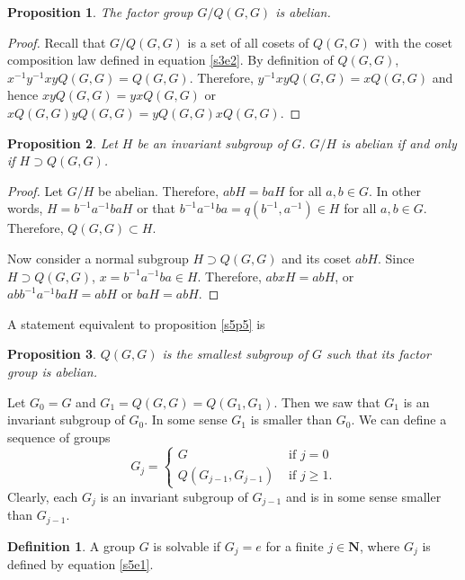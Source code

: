\documentclass{article}
\theoremstyle{plain}
\numberwithin{thm}{section}
\theoremstyle{plain}
\newtheorem{prop}{Proposition}
\numberwithin{prop}{section}
\theoremstyle{definition}
\newtheorem{defn}{Definition}
\numberwithin{defn}{section}
\theoremstyle{remark}
\numberwithin{equation}{section}
\begin{document}
\begin{prop}\label{s5p4}
The factor group $G/Q(G, G)$ is abelian.
\end{prop}
\begin{proof}
Recall that $G/Q(G, G)$ is a set of all cosets of $Q(G, G)$ with the coset
composition law defined in equation \eqref{s3e2}. By definition of $Q(G, G)$,
$x^{-1}y^{-1}xyQ(G, G) = Q(G, G)$. Therefore, $y^{-1}xyQ(G, G) = xQ(G, G)$ and
hence $xyQ(G, G) = yxQ(G, G)$ or $xQ(G, G) yQ(G, G) = yQ(G, G) xQ(G, G)$.
\end{proof}

\begin{prop}\label{s5p5}
Let $H$ be an invariant subgroup of $G$. $G/H$ is abelian if and only if $H
\supset Q(G, G)$.
\end{prop}
\begin{proof}
Let $G/H$ be abelian. Therefore, $abH = baH$ for all $a, b \in G$. In other
words, $H = b^{-1}a^{-1}baH$ or that $b^{-1}a^{-1}ba = q(b^{-1}, a^{-1}) \in
H$ for all $a, b \in G$. Therefore, $Q(G, G) \subset H$.

Now consider a normal subgroup $H \supset Q(G, G)$ and its coset $abH$.
Since $H \supset Q(G, G)$, $x = b^{-1}a^{-1}ba \in H$. Therefore, $abxH = abH$,
or $abb^{-1}a^{-1}ba H = abH$ or $baH = abH$.
\end{proof}

A statement equivalent to proposition \eqref{s5p5} is
\begin{prop}\label{s5p6}
$Q(G, G)$ is the smallest subgroup of $G$ such that its factor group is
abelian.
\end{prop}

Let $G_0 = G$ and $G_1 = Q(G, G) = Q(G_1, G_1)$. Then we saw that $G_1$ is an
invariant subgroup of $G_0$. In some sense $G_1$ is smaller than $G_0$. We can
define a sequence of groups
\begin{equation}\label{s5e1}
G_j = \begin{cases}
G & \text{ if } j = 0 \\
Q(G_{j-1}, G_{j-1}) & \text{ if } j \ge 1.
\end{cases}
\end{equation}
Clearly, each $G_{j}$ is an invariant subgroup of $G_{j-1}$ and is in some
sense smaller than $G_{j-1}$. 

\begin{defn}\label{s5d3}
A group $G$ is solvable if $G_j = {e}$ for a finite $j \in \mathbf{N}$, where
$G_j$ is defined by equation \eqref{s5e1}.
\end{defn}
\end{document}

